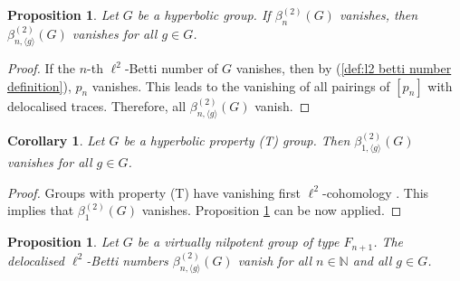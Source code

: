 \documentclass[a4paper,leqno,12pt]{article}
\numberwithin{equation}{section}
\theoremstyle{plain}
\newtheorem{corollary}[theoremcounter]{Corollary}
\newtheorem{proposition}[theoremcounter]{Proposition}
\theoremstyle{definition}
\theoremstyle{remark}
\newtheorem{remark}[theoremcounter]{Remark}
\begin{document}
	\begin{proposition} \label{prop:l2 vanishing}
		Let $G$ be a hyperbolic group. If $\beta_n^ {(2)} (G)$ vanishes, then $\beta_{n, \langle g \rangle}^ {(2)}(G)$ vanishes for all $g\in G$.
	\end{proposition}
	
	\begin{proof}
		If the $n$-th $\ell^2$-Betti number of $G$ vanishes, then by (\ref{def:l2 betti number definition}), $p_n$ vanishes. This leads to the vanishing of all pairings of $[p_n]$ with delocalised traces. Therefore, all $\beta_{n, \langle g \rangle}^ {(2)}(G)$ vanish.
	\end{proof}

	
	\begin{corollary}\label{cor:property T}
		Let $G$ be a hyperbolic property (T) group. Then $\beta^ {(2)}_{1, \langle{g}\rangle} (G)$ vanishes for all $g\in G$. 
	\end{corollary}
	
	\begin{proof}
		 Groups with property (T) have vanishing first $\ell^2$-cohomology \cite{delorme1977}. This implies that $\beta_1^{(2)}(G)$ vanishes.
		Proposition \ref{prop:l2 vanishing} can be now applied.
	\end{proof}

 	\begin{proposition} \label{prop:vir.nilpotent}
		Let $G$ be a virtually nilpotent group of type $F_{n+1}$. The delocalised $\ell^2$-Betti numbers $\beta^ {(2)}_{n, \langle{g}\rangle} (G)$ vanish for all $n\in \mathbb N$ and all $g\in G$.
	\end{proposition}  
 
\end{document}
